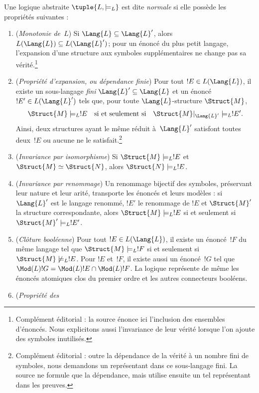 \documentclass[../../../include/open-logic-section]{subfiles}
\begin{document}
\begin{defn}
Une logique abstraite
$\tuple{L,\models_L}$ est dite
\emph{normale} si elle possède
les propriétés suivantes :
\begin{enumerate}
\item (\emph{Monotonie de~$L$})
  Si $\Lang{L}\subseteq\Lang{L}'$,
  alors $L(\Lang{L})\subseteq
  L(\Lang{L}')$; pour un énoncé
  du plus petit langage, l'expansion
  d'une structure aux symboles
  supplémentaires ne change pas
  sa vérité.\footnote{Complément éditorial : la source énonce ici l'inclusion des ensembles d'énoncés. Nous explicitons aussi l'invariance de leur vérité lorsque l'on ajoute des symboles inutilisés.}
\item (\emph{Propriété d'expansion,
  ou dépendance finie}) Pour tout
  $!E\in L(\Lang{L})$, il existe
  un sous-langage \emph{fini}
  $\Lang{L}'\subseteq\Lang{L}$
  et un énoncé $!E'\in L(\Lang{L}')$
  tels que, pour toute
  $\Lang{L}$-structure $\Struct{M}$,
  \[
    \Struct{M}\models_L !E
    \quad\text{si et seulement si}\quad
    \Struct{M}|_{\Lang{L}'}\models_L !E'.
  \]
  Ainsi, deux
  structures ayant le même réduit
  à~$\Lang{L}'$ satisfont toutes
  deux~$!E$ ou aucune ne le satisfait.\footnote{Complément éditorial : outre la dépendance de la vérité à un nombre fini de symboles, nous demandons un représentant dans ce sous-langage fini. La source ne formule que la dépendance, mais utilise ensuite un tel représentant dans les preuves.}
\item (\emph{Invariance par
  isomorphisme}) Si
  $\Struct{M}\models_L !E$ et
  $\Struct{M}\simeq\Struct{N}$,
  alors $\Struct{N}\models_L !E$.
\item (\emph{Invariance par
  renommage}) Un renommage bijectif
  des symboles, préservant leur
  nature et leur arité, transporte
  les énoncés et leurs modèles :
  si $\Lang{L}'$ est le langage
  renommé, $!E'$ le renommage de
  $!E$ et $\Struct{M}'$ la structure
  correspondante, alors
  $\Struct{M}\models_L !E$ si et
  seulement si
  $\Struct{M}'\models_L !E'$.
\item (\emph{Clôture booléenne})
  Pour tout $!E\in L(\Lang{L})$,
  il existe un énoncé~$!F$ du même
  langage tel que
  $\Struct{M}\models_L !F$ si et
  seulement si
  $\Struct{M}\not\models_L !E$.
  Pour $!E$ et~$!F$, il existe
  aussi un énoncé~$!G$ tel que
  $\Mod(L){!G}=\Mod(L){!E}\cap
  \Mod(L){!F}$. La logique représente
  de même les énoncés atomiques
  clos du premier ordre et les autres
  connecteurs booléens.
\item (\emph{Propriété des
}
\end{enumerate}
\end{defn}
\end{document}
